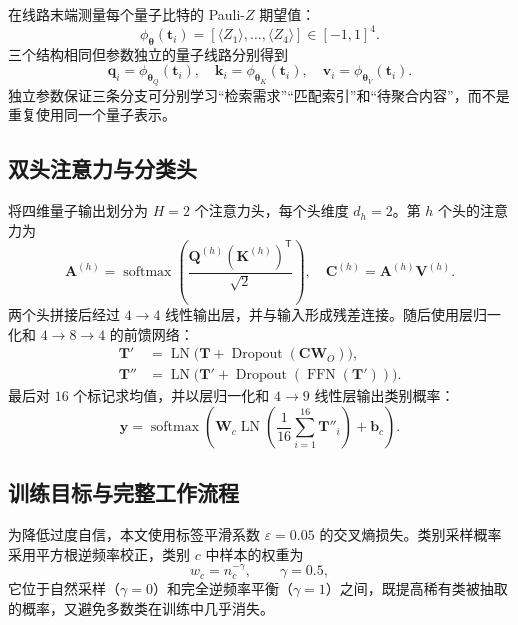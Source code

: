 \documentclass[journal]{IEEEtran}
\begin{document}
在线路末端测量每个量子比特的 Pauli-$Z$ 期望值：
\begin{equation}
  \phi_{\bm{\theta}}(\bm{t}_i)=
  [\langle Z_1\rangle,\ldots,\langle Z_4\rangle]\in[-1,1]^4.
  \label{eq:z_measurement}
\end{equation}
三个结构相同但参数独立的量子线路分别得到
\begin{equation}
  \bm{q}_i=\phi_{\bm{\theta}_Q}(\bm{t}_i),\quad
  \bm{k}_i=\phi_{\bm{\theta}_K}(\bm{t}_i),\quad
  \bm{v}_i=\phi_{\bm{\theta}_V}(\bm{t}_i).
  \label{eq:quantum_qkv}
\end{equation}
独立参数保证三条分支可分别学习“检索需求”“匹配索引”和“待聚合内容”，而不是重复使用同一个量子表示。

\subsection{双头注意力与分类头}

将四维量子输出划分为 $H=2$ 个注意力头，每个头维度 $d_h=2$。第 $h$ 个头的注意力为
\begin{equation}
  \bm{A}^{(h)}=
  \operatorname{softmax}\left(
    \frac{\bm{Q}^{(h)}(\bm{K}^{(h)})^{\mathsf T}}{\sqrt{2}}
  \right),\quad
  \bm{C}^{(h)}=\bm{A}^{(h)}\bm{V}^{(h)}.
\end{equation}
两个头拼接后经过 $4\rightarrow4$ 线性输出层，并与输入形成残差连接。随后使用层归一化和 $4\rightarrow8\rightarrow4$ 的前馈网络：
\begin{align}
  \bm{T}'&=\operatorname{LN}\bigl(\bm{T}+\operatorname{Dropout}(\bm{C}\bm{W}_O)\bigr),\\
  \bm{T}''&=\operatorname{LN}\bigl(\bm{T}'+
  \operatorname{Dropout}(\operatorname{FFN}(\bm{T}'))\bigr).
\end{align}
最后对 $16$ 个标记求均值，并以层归一化和 $4\rightarrow9$ 线性层输出类别概率：
\begin{equation}
  \hat{\bm{y}}=\operatorname{softmax}\left(
  \bm{W}_c\operatorname{LN}\left(
  \frac{1}{16}\sum_{i=1}^{16}\bm{T}''_i
  \right)+\bm{b}_c\right).
\end{equation}

\subsection{训练目标与完整工作流程}

为降低过度自信，本文使用标签平滑系数 $\varepsilon=0.05$ 的交叉熵损失。类别采样概率采用平方根逆频率校正，类别 $c$ 中样本的权重为
\begin{equation}
  w_c=n_c^{-\gamma},\qquad \gamma=0.5,
\end{equation}
它位于自然采样（$\gamma=0$）和完全逆频率平衡（$\gamma=1$）之间，既提高稀有类被抽取的概率，又避免多数类在训练中几乎消失。
\end{document}
